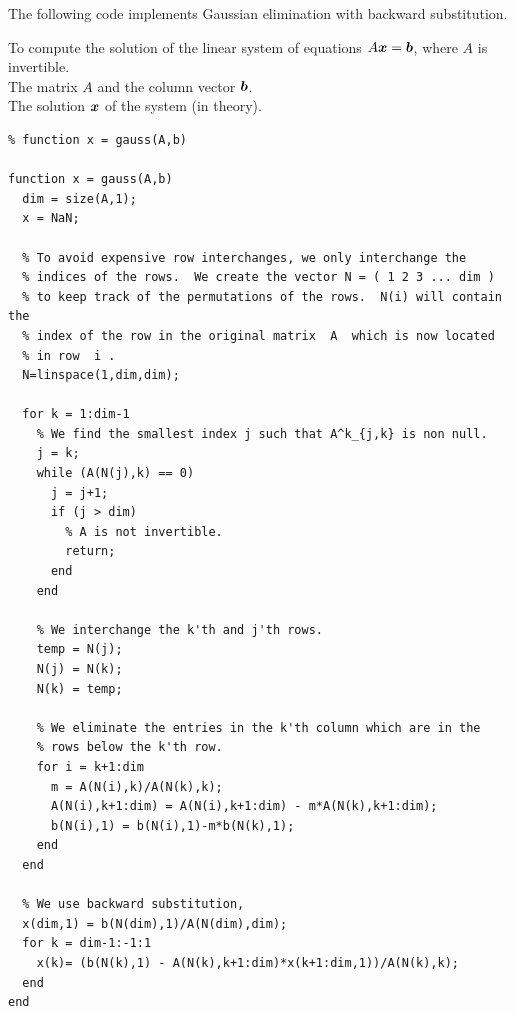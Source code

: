 The following code implements Gaussian elimination with backward
substitution.

\begin{code}
To compute the solution of the linear system of equations
$A\bm{x} = \bm{b}$, where $A$ is invertible.\\
 The matrix $A$ and the column vector $\bm{b}$. \\
 The solution $\bm{x}$ of the system (in theory).
\small
\begin{verbatim}
% function x = gauss(A,b)

function x = gauss(A,b)
  dim = size(A,1);
  x = NaN;

  % To avoid expensive row interchanges, we only interchange the
  % indices of the rows.  We create the vector N = ( 1 2 3 ... dim )
  % to keep track of the permutations of the rows.  N(i) will contain the
  % index of the row in the original matrix  A  which is now located
  % in row  i .
  N=linspace(1,dim,dim);

  for k = 1:dim-1
    % We find the smallest index j such that A^k_{j,k} is non null.
    j = k;
    while (A(N(j),k) == 0)
      j = j+1;
      if (j > dim)
        % A is not invertible.
        return;
      end
    end

    % We interchange the k'th and j'th rows.
    temp = N(j);
    N(j) = N(k);
    N(k) = temp;

    % We eliminate the entries in the k'th column which are in the
    % rows below the k'th row.
    for i = k+1:dim
      m = A(N(i),k)/A(N(k),k);
      A(N(i),k+1:dim) = A(N(i),k+1:dim) - m*A(N(k),k+1:dim);
      b(N(i),1) = b(N(i),1)-m*b(N(k),1);
    end
  end

  % We use backward substitution,
  x(dim,1) = b(N(dim),1)/A(N(dim),dim);
  for k = dim-1:-1:1
    x(k)= (b(N(k),1) - A(N(k),k+1:dim)*x(k+1:dim,1))/A(N(k),k);
  end
end
\end{verbatim}
\end{code}

